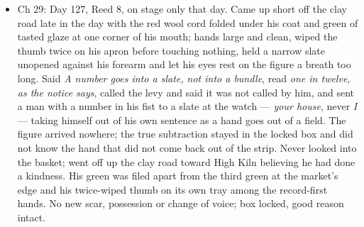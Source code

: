 \documentclass{design/chronicle}
\begin{document}
{\begin{itemize}[leftmargin=1.4em,itemsep=1pt,topsep=3pt,parsep=0pt]
\end{itemize}

\begin{itemize}[leftmargin=1.4em,itemsep=1pt,topsep=3pt,parsep=0pt]

\item Ch 29: Day 127, Reed 8, on stage only that day. Came up short off the clay road late in the day with the red wool cord folded under his coat and green of tasted glaze at one corner of his mouth; hands large and clean, wiped the thumb twice on his apron before touching nothing, held a narrow slate unopened against his forearm and let his eyes rest on the figure a breath too long. Said \emph{A number goes into a slate, not into a bundle}, read \emph{one in twelve, as the notice says}, called the levy and said it was not called by him, and sent a man with a number in his fist to a slate at the watch — \emph{your house}, never \emph{I} — taking himself out of his own sentence as a hand goes out of a field. The figure arrived nowhere; the true subtraction stayed in the locked box and did not know the hand that did not come back out of the strip. Never looked into the basket; went off up the clay road toward High Kiln believing he had done a kindness. His green was filed apart from the third green at the market’s edge and his twice-wiped thumb on its own tray among the record-first hands. No new scar, possession or change of voice; box locked, good reason intact.

\end{itemize}
}
\end{document}
